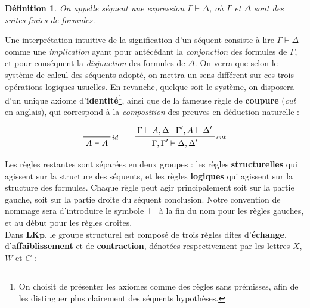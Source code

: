 \documentclass[11pt]{report}
\newcommand{\seq}{\vdash}
\newcommand{\irule}[1]{\footnotesize$#1$}
\newcommand{\iruleL}[1]{\irule{{#1}\seq}}
\newcommand{\iruleR}[1]{\irule{\seq{#1}}}
\newtheorem{definition}{Définition}
\begin{document}
\begin{definition}
    On appelle \emph{séquent} une expression $\Gamma \seq \Delta$, où $\Gamma$ et $\Delta$ sont des suites finies de formules.
\end{definition}

Une interprétation intuitive de la signification d'un séquent consiste à lire $\Gamma \seq \Delta$ comme une \emph{implication} ayant pour antécédant la \emph{conjonction} des formules de $\Gamma$, et pour conséquent la \emph{disjonction} des formules de $\Delta$. On verra que selon le système de calcul des séquents adopté, on mettra un sens différent sur ces trois opérations logiques usuelles. En revanche, quelque soit le système, on disposera d'un unique axiome d'\textbf{identité}\footnote{On choisit de présenter les axiomes comme des règles sans prémisses, afin de les distinguer plus clairement des séquents hypothèses.}, ainsi que de la fameuse règle de \textbf{coupure} (\emph{cut} en anglais), qui correspond à la \emph{composition} des preuves en déduction naturelle :

\begin{displaymath}
    \prfbyaxiom{\irule{id}}{A \seq A}
    \qquad
    \prftree[r]{\irule{cut}}
        {\Gamma \seq A,\Delta}
        {\Gamma',A \seq \Delta'}
        {\Gamma,\Gamma' \seq \Delta,\Delta'}
\end{displaymath}

Les règles restantes sont séparées en deux groupes : les règles \textbf{structurelles} qui agissent sur la structure des séquents, et les règles \textbf{logiques} qui agissent sur la structure des formules. Chaque règle peut agir principalement soit sur la partie gauche, soit sur la partie droite du séquent conclusion. Notre convention de nommage sera d'introduire le symbole $\seq$ à la fin du nom pour les règles gauches, et au début pour les règles droites.\\

Dans $\mathbf{LKp}$, le groupe structurel est composé de trois règles dites d'\textbf{échange}, d'\textbf{affaiblissement} et de \textbf{contraction}, dénotées respectivement par les lettres $X$, $W$ et $C$ :

\end{document}
